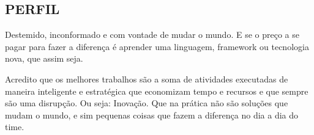
  \begin{framed}
    \section{PERFIL}

    Destemido, inconformado e com vontade de mudar o mundo. E se o preço a se pagar para fazer a diferença é aprender uma linguagem, framework ou tecnologia nova, que assim seja.

    Acredito que os melhores trabalhos são a soma de atividades executadas de maneira inteligente e estratégica que economizam tempo e recursos e que sempre são uma disrupção. Ou seja: Inovação. Que na prática não são soluções que mudam o mundo, e sim pequenas coisas que fazem a diferença no dia a dia do time.
  \end{framed}